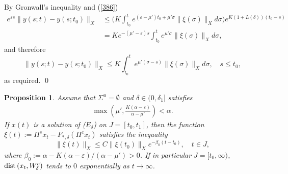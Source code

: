 \documentclass[12pt]{amsart}
\newtheorem{Prop}{Proposition}
\begin{document}
By Gronwall's inequality and (\ref{386})
\begin{align*}
   e^{\varepsilon s}\|y(s;t)-y(s;t_0)\|_X 
   &\leq  \Big( K\int_{t_0}^t e^{(\varepsilon-\mu')t_0+\mu'\sigma}\|\xi(\sigma)\|_Xd\sigma  \Big) e^{K(1+L(\delta))(t_0-s)}   \\
   &= K e^{-(\mu'-\varepsilon )s} \int_{t_0}^t e^{\mu'\sigma}\|\xi(\sigma)\|_Xd\sigma,       
\end{align*}
and therefore
$$
   \|y(s;t)-y(s;t_0)\|_X \leq K  \int_{t_0}^t e^{\mu'(\sigma-s)}\|\xi(\sigma)\|_Xd\sigma, \quad s\leq t_0, 
$$
as required. \qed

\begin{Prop}\label{Proposition D6} 
Assume that $\Sigma^u=\emptyset$ and $\delta \in (0,\delta_1]$ satisfies 
\begin{align}\label{405}
   \max\left( \mu', \frac{K(\alpha -\varepsilon)}{\alpha -\mu'}\right) 
   <\alpha. 
\end{align}
If $x(t)$ is a solution of ($E_\delta$) on $J=[t_0,t_1]$, then the 
function $\xi(t):=\Pi^s x_t-F_{\ast,\delta}(\Pi^c x_t)$ satisfies the 
inequality
$$
   \|\xi(t)\|_X\leq C\|\xi(t_0)\|_Xe^{-\beta_0(t-t_0)}, \quad t\in J,
$$  
where $\beta _0:=\alpha -K(\alpha- \varepsilon) /(\alpha -\mu')>0$. 
If in particular $J=[t_0,\infty)$, ${\rm dist}\,(x_t,W^c_\delta)$ 
tends to $0$ exponentially as $t\to\infty$. 
\end{Prop}
\end{document}
